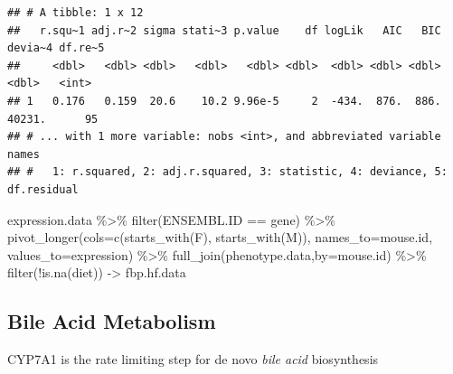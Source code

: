 \documentclass[
]{article}
\newenvironment{Shaded}{\begin{snugshade}}{\end{snugshade}}
\newcommand{\AttributeTok}[1]{\textcolor[rgb]{0.77,0.63,0.00}{#1}}
\newcommand{\FunctionTok}[1]{\textcolor[rgb]{0.00,0.00,0.00}{#1}}
\newcommand{\NormalTok}[1]{#1}
\newcommand{\OtherTok}[1]{\textcolor[rgb]{0.56,0.35,0.01}{#1}}
\newcommand{\SpecialCharTok}[1]{\textcolor[rgb]{0.00,0.00,0.00}{#1}}
\newcommand{\StringTok}[1]{\textcolor[rgb]{0.31,0.60,0.02}{#1}}
\begin{document}
\begin{verbatim}
## # A tibble: 1 x 12
##   r.squ~1 adj.r~2 sigma stati~3 p.value    df logLik   AIC   BIC devia~4 df.re~5
##     <dbl>   <dbl> <dbl>   <dbl>   <dbl> <dbl>  <dbl> <dbl> <dbl>   <dbl>   <int>
## 1   0.176   0.159  20.6    10.2 9.96e-5     2  -434.  876.  886.  40231.      95
## # ... with 1 more variable: nobs <int>, and abbreviated variable names
## #   1: r.squared, 2: adj.r.squared, 3: statistic, 4: deviance, 5: df.residual
\end{verbatim}

\begin{Shaded}
\begin{Highlighting}[]
\NormalTok{expression.data }\SpecialCharTok{\%\textgreater{}\%}
  \FunctionTok{filter}\NormalTok{(ENSEMBL.ID }\SpecialCharTok{==}\NormalTok{ gene) }\SpecialCharTok{\%\textgreater{}\%}
  \FunctionTok{pivot\_longer}\NormalTok{(}\AttributeTok{cols=}\FunctionTok{c}\NormalTok{(}\FunctionTok{starts\_with}\NormalTok{(}\StringTok{\textquotesingle{}F\textquotesingle{}}\NormalTok{),}
                      \FunctionTok{starts\_with}\NormalTok{(}\StringTok{\textquotesingle{}M\textquotesingle{}}\NormalTok{)),}
               \AttributeTok{names\_to=}\StringTok{\textquotesingle{}mouse.id\textquotesingle{}}\NormalTok{,}
               \AttributeTok{values\_to=}\StringTok{\textquotesingle{}expression\textquotesingle{}}\NormalTok{) }\SpecialCharTok{\%\textgreater{}\%}
  \FunctionTok{full\_join}\NormalTok{(phenotype.data,}\AttributeTok{by=}\StringTok{\textquotesingle{}mouse.id\textquotesingle{}}\NormalTok{) }\SpecialCharTok{\%\textgreater{}\%}
  \FunctionTok{filter}\NormalTok{(}\SpecialCharTok{!}\FunctionTok{is.na}\NormalTok{(diet)) }\OtherTok{{-}\textgreater{}}\NormalTok{ fbp.hf.data}
\end{Highlighting}
\end{Shaded}

\hypertarget{bile-acid-metabolism}{%
\subsection{Bile Acid Metabolism}\label{bile-acid-metabolism}}

CYP7A1 is the rate limiting step for de novo \emph{bile acid}
biosynthesis
\end{document}
